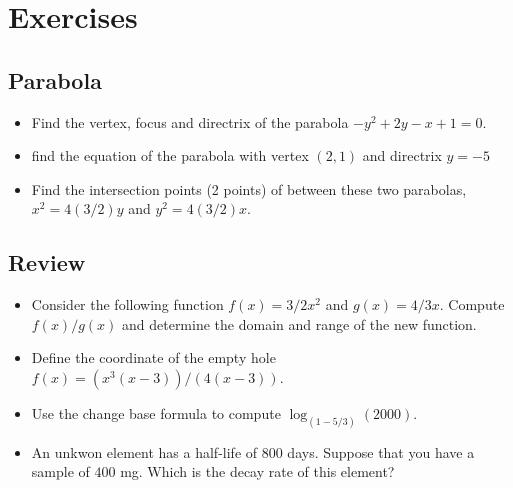 \documentclass[../main-exe.tex]{subfiles}
\begin{document}
\section{Exercises}

\subsection{Parabola}

\begin{itemize}
    \item Find the vertex, focus and directrix of the parabola $-y^2+2y-x+1=0$.
    \item find the equation of the parabola with vertex $(2,1)$ and directrix $y=-5$
    \item Find the intersection points (2 points) of between these two parabolas, $x^2=4(3/2)y$ and $y^2=4(3/2)x$.
\end{itemize}

\subsection{Review}

\begin{itemize}
    \item Consider the following function $f(x)=3/2 x^2$ and $g(x)=4/3x$. Compute $f(x)/g(x)$ and determine the domain and range of the new function.
    \item Define the coordinate of the empty hole $f(x)=(x^3(x-3))/(4(x-3))$.
    \item Use the change base formula to compute $\log_{(1-5/3)}(2000)$.
    \item An unkwon element has a half-life of 800 days. Suppose that you have a sample of $400$ mg. Which is the decay rate of this element?
\end{itemize}
\end{document}
